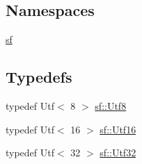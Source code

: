 \subsection*{Namespaces}
\begin{DoxyCompactItemize}
\item 
\hyperlink{namespacesf}{sf}
\end{DoxyCompactItemize}
\subsection*{Typedefs}
\begin{DoxyCompactItemize}
\item 
typedef Utf$<$ 8 $>$ \hyperlink{namespacesf_a8626e71b97fd5e81b6c02cdfe775780f}{sf\-::\-Utf8}
\item 
typedef Utf$<$ 16 $>$ \hyperlink{namespacesf_a0868ce4b7cda7b545427fe9044e456e2}{sf\-::\-Utf16}
\item 
typedef Utf$<$ 32 $>$ \hyperlink{namespacesf_ae8ddf58bb1d012fc076ea9d4f8ec2feb}{sf\-::\-Utf32}
\end{DoxyCompactItemize}
